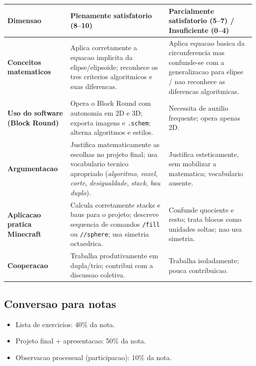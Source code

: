 \documentclass[12pt,a4paper]{scrartcl}
\newcommand{\cmd}[1]{\textcolor{earth}{\texttt{\small #1}}}
\begin{document}
\begin{center}
\small
\begin{tabularx}{\textwidth}{@{}p{}XX@{}}
\toprule
\textbf{Dimensao} & \textbf{Plenamente satisfatorio (8--10)} & \textbf{Parcialmente satisfatorio (5--7) / Insuficiente (0--4)} \\
\midrule
\textbf{Conceitos matematicos} & Aplica corretamente a equacao implicita da elipse/elipsoide; reconhece os tres criterios algoritmicos e suas diferencas. & Aplica equacao basica da circunferencia mas confunde-se com a generalizacao para elipse / nao reconhece as diferencas algoritmicas. \\
\addlinespace[3pt]
\textbf{Uso do software (Block Round)} & Opera o Block Round com autonomia em 2D e 3D; exporta imagens e \texttt{.schem}; alterna algoritmos e estilos. & Necessita de auxilio frequente; opera apenas 2D. \\
\addlinespace[3pt]
\textbf{Argumentacao} & Justifica matematicamente as escolhas no projeto final; usa vocabulario tecnico apropriado (\emph{algoritmo}, \emph{voxel}, \emph{corte}, \emph{desigualdade}, \emph{stack}, \emph{bau duplo}). & Justifica esteticamente, sem mobilizar a matematica; vocabulario ausente. \\
\addlinespace[3pt]
\textbf{Aplicacao pratica Minecraft} & Calcula corretamente stacks e baus para o projeto; descreve sequencia de comandos \cmd{/fill} ou \cmd{//sphere}; usa simetria octaedrica. & Confunde quociente e resto; trata blocos como unidades soltas; nao usa simetria. \\
\addlinespace[3pt]
\textbf{Cooperacao} & Trabalha produtivamente em dupla/trio; contribui com a discussao coletiva. & Trabalha isoladamente; pouca contribuicao. \\
\bottomrule
\end{tabularx}
\end{center}

\subsection{Conversao para notas}
\begin{itemize}[leftmargin=1.3em,itemsep=0.1em,topsep=0.2em,nosep]
  \item Lista de exercicios: 40\% da nota.
  \item Projeto final + apresentacao: 50\% da nota.
  \item Observacao processual (participacao): 10\% da nota.
\end{itemize}
\end{document}
